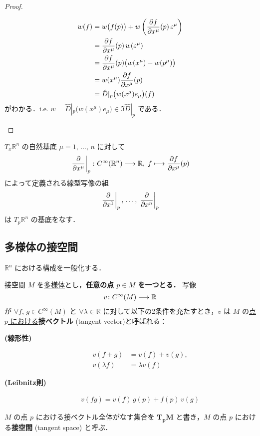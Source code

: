 \documentclass[geometry_main]{subfiles}
\begin{document}
\begin{proof}
\begin{enumerate}
\begin{description}
			\begin{align}
				w(f) 
				&= w \bigl( f(p) \bigr) + w \left( \pdv{f}{x^\mu}()(p)\, \varepsilon^\mu \right) \\
				&= \pdv{f}{x^\mu}()(p)\, w ( \varepsilon^\mu ) \\
				&= \pdv{f}{x^\mu}()(p)\bigl(w(x^\mu) - w(p^\mu)\bigr) \\
				&= w(x^\mu) \pdv{f}{x^\mu}()(p) \\
				&= \hat{D}|_p \bigl( w(x^\mu)e_\mu \bigr) (f)
			\end{align}
			がわかる．i.e. $w = \hat{D}|_p \bigl( w(x^\mu)e_\mu \bigr) \in \Im \hat{D}|_p$ である．
		\end{description}
	\end{enumerate}
\end{proof}

\begin{mycol}[label=col:basis-tangentv-Rn]{$T_x\mathbb{R}^n$ の自然基底}
	$\mu = 1,\, \dots,\, n$ に対して
	\begin{align}
		\eval{\pdv{}{x^\mu}}_p \colon \cinftyf{\mathbb{R}^n} \lto \mathbb{R},\; f \lmto \pdv{f}{x^\mu}()(p)
	\end{align}
	によって定義される線型写像の組
	\begin{align}
		\eval{\pdv{}{x^1}}_p,\, \dots,\, \eval{\pdv{}{x^n}}_p
	\end{align}
	は $T_p \mathbb{R}^n$ の基底をなす．
\end{mycol}

\subsection{\cinfty 多様体の接空間}

$\mathbb{R}^n$ における構成を一般化する．
\begin{mydef}[label=def.tangentv]{接空間}
	$M$ を\hyperref[diffmani]{\cinfty 多様体}とし，\textbf{任意の点 $p \in M$ を一つとる．} 写像 
	\begin{align}
		v\colon C^\infty (M) \longrightarrow \mathbb{R}
	\end{align} 
	が $\forall f,\, g \in C^\infty (M)$ と $\forall \lambda \in \mathbb{R}$ に対して以下の2条件を充たすとき，$v$ は $M$ の\underline{点 $p$ における}\textbf{接ベクトル} (tangent vector)と呼ばれる：
	\begin{description}
		\item[\textbf{(線形性)}] 
		\begin{align}
			v(f + g) &= v(f) + v(g),\\
			v(\lambda f) &= \lambda v(f)
		\end{align}
		\item[\textbf{(Leibnitz則)}] \begin{align}
			v(fg) = v(f)\, g(p) + f(p)\, v(g)
		\end{align}
	\end{description}
	$M$ の点 $p$ における接ベクトル全体がなす集合を $\bm{T_pM}$ と書き，$M$ の点 $p$ における\textbf{接空間} (tangent space) と呼ぶ．
\end{mydef}
\end{document}
